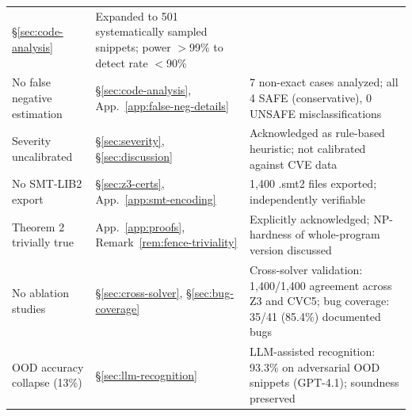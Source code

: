 \documentclass[11pt]{article}
\begin{document}
\begin{longtable}{p{5cm}p{2cm}p{5cm}}
  \S\ref{sec:code-analysis} &
  Expanded to 501 systematically sampled snippets;
  power $>$99\% to detect rate $<$90\% \\
No false negative estimation &
  \S\ref{sec:code-analysis}, App.~\ref{app:false-neg-details} &
  7 non-exact cases analyzed; all 4 SAFE (conservative),
  0 UNSAFE misclassifications \\
Severity uncalibrated &
  \S\ref{sec:severity}, \S\ref{sec:discussion} &
  Acknowledged as rule-based heuristic; not calibrated
  against CVE data \\
No SMT-LIB2 export &
  \S\ref{sec:z3-certs}, App.~\ref{app:smt-encoding} &
  1{,}400 .smt2 files exported; independently verifiable \\
Theorem 2 trivially true &
  App.~\ref{app:proofs}, Remark~\ref{rem:fence-triviality} &
  Explicitly acknowledged; NP-hardness of whole-program
  version discussed \\
No ablation studies &
  \S\ref{sec:cross-solver}, \S\ref{sec:bug-coverage} &
  Cross-solver validation: 1{,}400/1{,}400 agreement across
  Z3 and CVC5; bug coverage: 35/41 (85.4\%) documented bugs \\
OOD accuracy collapse (13\%) &
  \S\ref{sec:llm-recognition} &
  LLM-assisted recognition: 93.3\% on adversarial OOD
  snippets (GPT-4.1); soundness preserved \\
\end{longtable}
\end{document}

